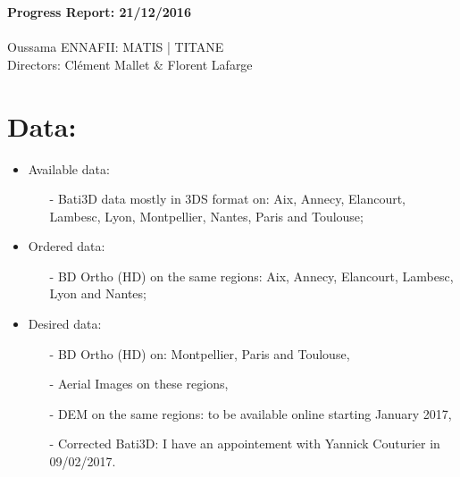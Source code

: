 \documentclass[a4paper, 11pt]{article}
\begin{document}
	\begin{centering}
		\large\textbf{Progress Report: 21/12/2016}\\
		~\\
		Oussama ENNAFII:
		\normalsize MATIS | TITANE \\
		Directors: Cl\'ement Mallet \& Florent Lafarge \\
	\end{centering}


	\section*{Data:}
	
	\begin{itemize}
		\item Available data:
			\begin{itemize}
				\item[-] Bati3D data mostly in 3DS format on: Aix, Annecy, Elancourt, Lambesc, Lyon, Montpellier, Nantes, Paris and Toulouse;
			\end{itemize}
		\item Ordered data:
			\begin{itemize}
				\item[-] BD Ortho (HD) on the same regions: Aix, Annecy, Elancourt, Lambesc, Lyon and Nantes;
			\end{itemize}
		\item Desired data:
			\begin{itemize}
				\item[-] BD Ortho (HD) on: Montpellier, Paris and Toulouse,
				\item[-] Aerial Images on these regions,
				\item[-] DEM on the same regions: to be available online starting January 2017,
				\item[-] Corrected Bati3D: I have an appointement with Yannick Couturier in 09/02/2017.
			\end{itemize}
	\end{itemize}
	
\end{document}
